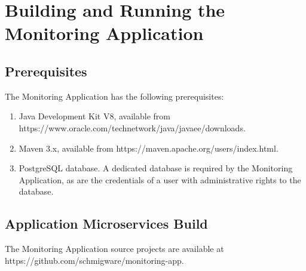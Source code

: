 \chapter{Building and Running the Monitoring Application}

\section{Prerequisites} 

The Monitoring Application has the following prerequisites:

\begin{enumerate}
	
	\item Java Development Kit V8, available from \newline https://www.oracle.com/technetwork/java/javaee/downloads.
	\item Maven 3.x, available from https://maven.apache.org/users/index.html. 
	\item PostgreSQL database. A dedicated database is required by the Monitoring Application, as are the credentials of a user with administrative rights to the database.
	
\end{enumerate}
	
\section{Application Microservices Build}  

The Monitoring Application source projects are available at \newline
 https://github.com/schmigware/monitoring-app. 

